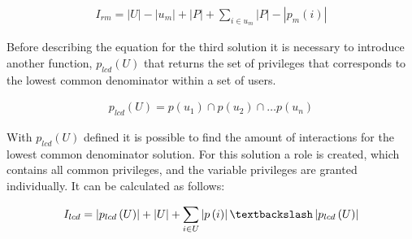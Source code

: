 \begin{align}
I_{rm} = |U| - |u_{m}| + |P| + \sum_{i \in u_{m}} |P|-|p_{m}(i)|
\end{align}

Before describing the equation for the third solution it is necessary to introduce another function, $p_{lcd}(U)$ that returns the set of privileges that corresponds to the lowest common denominator within a set of users.

\begin{align}
p_{lcd}(U) = p(u_1) \cap p(u_2) \cap \dots p(u_n)
\end{align}

With $p_{lcd}(U)$ defined it is possible to find the amount of interactions for the lowest common denominator solution.
For this solution a role is created, which contains all common privileges, and the variable privileges are granted individually.
It can be calculated as follows:

\begin{align}
I_{lcd} = \left|p_{lcd}\left(U\right)\right| + \left|U\right| + \sum_{i \in U} \left|p\left(i\right)\right|\textbackslash\left|p_{lcd}\left(U\right)\right|
\end{align}